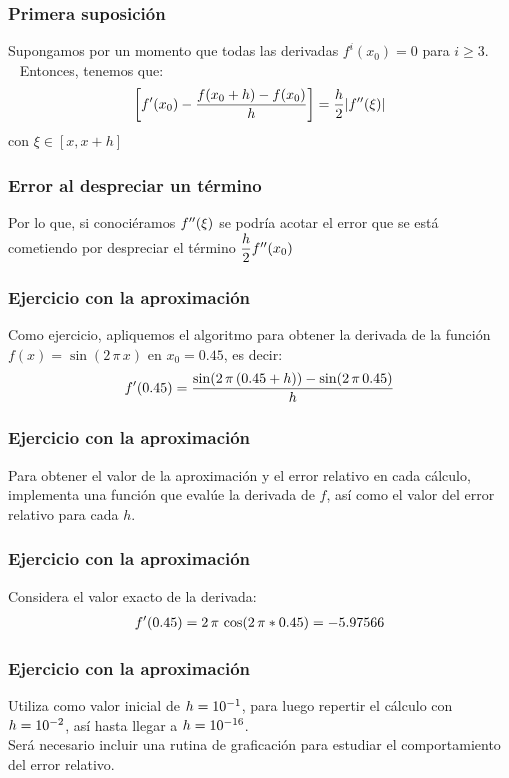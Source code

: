 \documentclass[12pt]{beamer}
\begin{document}
\begin{frame}
\frametitle{Primera suposición}
Supongamos por un momento que todas las derivadas $f^{i}(x_{0}) = 0$ para $i \geq 3$.
\\\
\bigskip
\pause
Entonces, tenemos que:
\begin{align*}
\left[ {f}^{\prime} (x_{0}) - \dfrac{f (x_{0} + h) - f (x_{0})}{h} \right] = \dfrac{h}{2} \abs{ {f}^{\prime \prime} (\xi) }
\end{align*}
con $\xi \in [x, x + h]$
\end{frame}
\begin{frame}
\frametitle{Error al despreciar un término}
Por lo que, si conociéramos ${f}^{\prime \prime} (\xi)$ se podría acotar el error que se está cometiendo por despreciar el término $\dfrac{h}{2} {f}^{\prime \prime} (x_{0})$
\end{frame}
\begin{frame}
\frametitle{Ejercicio con la aproximación}
Como ejercicio, apliquemos el algoritmo para obtener la derivada de la función $f (x) = \sin(2 \, \pi \,  x)$ en $x_{0} = 0.45$, es decir:
\begin{align*}
{f}^{\prime} (0.45) = \dfrac{\sin (2 \, \pi \, (0.45 + h)) - \sin (2 \, \pi \, 0.45)}{h}
\end{align*}
\end{frame}
\begin{frame}
\frametitle{Ejercicio con la aproximación}
Para obtener el valor de la aproximación y el error relativo en cada cálculo, implementa una función que evalúe la derivada de $f$, así como el valor del error relativo para cada $h$.
\end{frame}
\begin{frame}
\frametitle{Ejercicio con la aproximación}
Considera el valor exacto de la derivada:
\begin{align*}
{f}^{\prime} (0.45) = 2 \, \pi \, \cos(2 \, \pi * 0.45) = -5.97566
\end{align*}
\end{frame}
\begin{frame}
\frametitle{Ejercicio con la aproximación}
Utiliza como valor inicial de $h = \num{d-1}$, para luego repertir el cálculo con $h = \num{d-2}$, así hasta llegar a $h = \num{d-16}$.
\\
\bigskip
\pause
Será necesario incluir una rutina de graficación para estudiar el comportamiento del error relativo.
\end{frame}
\end{document}
